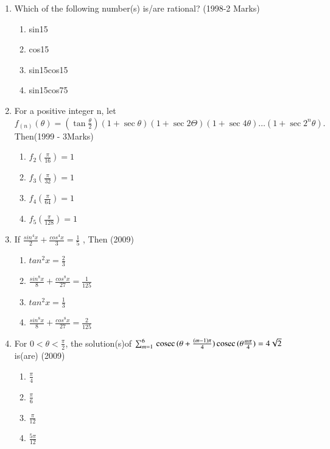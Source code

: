 \documentclass[journal,12pt,twocolumn]{IEEEtran}
\theoremstyle{remark}
\begin{document}
\begin{enumerate}
\item Which of the following number(s) is/are rational? \hfill(1998-2 Marks) \
\begin{enumerate}
    \item sin15\degree
    \item cos15\degree
    \item sin15\degree cos15\degree
    \item sin15\degree cos75\degree
\end{enumerate}
\item For a positive integer n, let \ 
$f_(n)(\theta) = (\tan\frac{\theta}{2})(1+\sec\theta)(1+\sec2\Theta)(1+\sec4\theta)\dots(1+\sec2^n\theta).$ Then\hfill (1999 - 3Marks)
\begin{enumerate}
    \item $f_2(\frac{\pi}{16}) = 1$
    \item $f_3(\frac{\pi}{32}) = 1$
    \item $f_4(\frac{\pi}{64}) = 1$
    \item $f_5(\frac{\pi}{128}) = 1$
\end{enumerate}
\item If $\frac{sin^4x}{2}+\frac{cos^4x}{3}=\frac{1}{5}$ , Then \hfill(2009) \
\begin{enumerate}
    \item $tan^2x=\frac{2}{3}$
    \item $\frac{sin^8x}{8}+\frac{cos^8x}{27}=\frac{1}{125}$
    \item $tan^2x=\frac{1}{3}$
    \item $\frac{sin^8x}{8}+\frac{cos^8x}{27}=\frac{2}{125}$
\end{enumerate}
\item For $ 0< \theta <\frac{\pi}{2}$, the solution(s)of $\sum_{m=1}^{6}\,\text{cosec}\,(\theta+\frac{(m-1)\pi}{4})\,\text{cosec}\,(\theta\frac{m\pi}{4}) = 4\sqrt{2}$ is(are) \hfill(2009) \
\begin{enumerate}
    \item $\frac{\pi}{4}$
    \item $\frac{\pi}{6}$
    \item $\frac{\pi}{12}$
    \item $\frac{5\pi}{12}$
\end{enumerate}


\end{enumerate}
\end{document}
